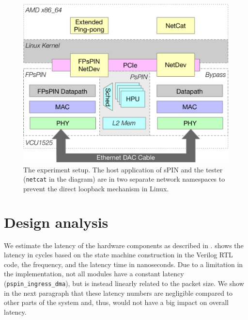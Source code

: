 \begin{figure}
    \centering
    \includegraphics[width=.9\linewidth]{figures/experiment-setup.pdf}
    \caption{The experiment setup.  The host application of sPIN and the tester (\texttt{netcat} in the diagram) are in two separate network namespaces to prevent the direct loopback mechanism in Linux.}
    \label{fig:experiment-setup}
\end{figure}

\section{Design analysis} \label{sec:hw-analysis}



We estimate the latency of the hardware components as described in .   shows the latency in cycles based on the state machine construction in the Verilog RTL code, the frequency, and the latency time in nanoseconds.  Due to a limitation in the implementation, not all modules have a constant latency (\texttt{pspin\_ingress\_dma}), but is instead linearly related to the packet size.  We show in the next paragraph that these latency numbers are negligible compared to other parts of the system and, thus, would not have a big impact on overall latency.

